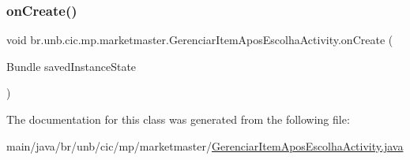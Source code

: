 \subsubsection{\texorpdfstring{on\+Create()}{onCreate()}}
{\footnotesize\ttfamily void br.\+unb.\+cic.\+mp.\+marketmaster.\+Gerenciar\+Item\+Apos\+Escolha\+Activity.\+on\+Create (\begin{DoxyParamCaption}\item[{Bundle}]{saved\+Instance\+State }\end{DoxyParamCaption})\hspace{0.3cm}{\ttfamily [protected]}}



The documentation for this class was generated from the following file\+:\begin{DoxyCompactItemize}
\item 
main/java/br/unb/cic/mp/marketmaster/\mbox{\hyperlink{GerenciarItemAposEscolhaActivity_8java}{Gerenciar\+Item\+Apos\+Escolha\+Activity.\+java}}\end{DoxyCompactItemize}
